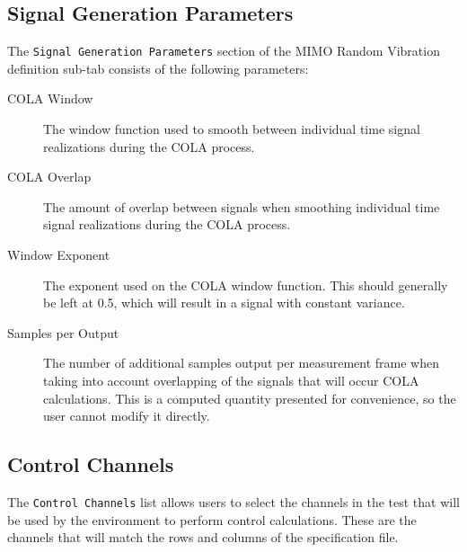 \documentclass[pdf,12pt,report]{SANDreport}
\newcommand{\inlineCode}{\lstinline[basicstyle=\bfseries\ttfamily]}
\begin{document}
    \subsection{Signal Generation Parameters}
    The \inlineCode{Signal Generation Parameters} section of the \Ac{MIMO} Random Vibration definition sub-tab consists of the following parameters:
    \begin{description}
        \item[COLA Window] The window function used to smooth between individual time signal realizations during the \ac{COLA} process.
        \item[COLA Overlap] The amount of overlap between signals when smoothing individual time signal realizations during the \ac{COLA} process.
        \item[Window Exponent] The exponent used on the \ac{COLA} window function.  This should generally be left at 0.5, which will result in a signal with constant variance.
        \item[Samples per Output] The number of additional samples output per measurement frame when taking into account overlapping of the signals that will occur \ac{COLA} calculations.  This is a computed quantity presented for convenience, so the user cannot modify it directly.
    \end{description}
    
    \subsection{Control Channels}
    The \inlineCode{Control Channels} list allows users to select the channels in the test that will be used by the environment to perform control calculations.  These are the channels that will match the rows and columns of the specification file.
    
\end{document}
